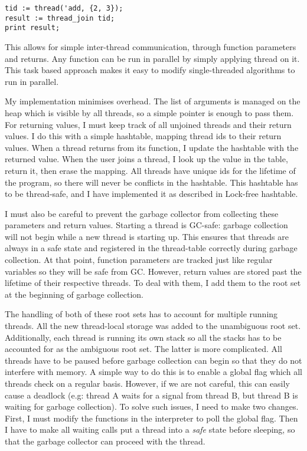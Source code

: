 \begin{verbatim}
tid := thread('add, {2, 3});
result := thread_join tid;
print result;
\end{verbatim}

This allows for simple inter-thread communication, through function parameters and returns. Any function can
be run in parallel by simply applying thread on it. This task based approach makes it easy to modify
single-threaded algorithms to run in parallel.

My implementation minimises overhead. The list of arguments is managed on the heap which is visible by all
threads, so a simple pointer is enough to pass them. For returning values, I must keep track of all
unjoined threads and their return values. I do this with a simple hashtable, mapping thread ids to their
return values. When a thread returns from its function, I update the hashtable with the returned value.
When the user joins a thread, I look up the value in the table, return it, then erase the mapping. All threads
have unique ids for the lifetime of the program, so there will never be conflicts in the hashtable.
This hashtable has to be thread-safe, and I have implemented it as described in Lock-free hashtable.

I must also be careful to prevent the garbage collector from collecting these parameters and return values.
Starting a thread is GC-safe: garbage collection will not begin while a new thread is starting up. This ensures
that threads are always in a safe state and registered in the thread-table correctly during garbage collection.
At that point, function parameters are tracked just like regular variables so they will be safe from GC.
However, return values are stored past the lifetime of their respective threads. To deal with them, I add them
to the root set at the beginning of garbage collection.

The handling of both of these root sets has to account for multiple running threads. All the new
thread-local storage was added to the unambiguous root set. Additionally, each thread is running its
own stack so all the stacks has to be accounted for as the ambiguous root set. The latter is more complicated.
All threads have to be paused before garbage collection can begin so that they do not interfere
with memory. A simple way to do this is to enable a global flag which all threads check on a regular basis.
However, if we are not careful, this can easily cause a deadlock (e.g: thread A waits for a signal from
thread B, but thread B is waiting for garbage collection). To solve such issues, I need to make two
changes. First, I must modify the functions in the interpreter to poll the global flag. Then I have
to make all waiting calls put a thread into a \emph{safe} state before sleeping, so that the garbage collector
can proceed with the thread.

